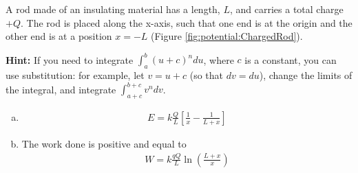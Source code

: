 \question \label{q:potential:E_field_from_rod} A rod made of an insulating material has a length, $L$, and carries a total charge $+Q$. The rod is placed along the x-axis, such that one end is at the origin and the other end is at a position $x=-L$ (Figure \ref{fig:potential:ChargedRod}).
\textbf{Hint:} If you need to integrate $\int_a^b (u+c)^n du$, where $c$ is a constant, you can use substitution: for example, let $v = u+c$ (so that $dv=du$), change the limits of the integral, and integrate $\int_{a+c}^{b+c}v^ndv$.
\begin{finalanswer}
\begin{enumerate}[(a)]
\item \begin{align*}
E=k\frac{Q}{L}\left[\frac{1}{x}-\frac{1}{L+x}\right]
\end{align*}
\item The work done is positive and equal to \begin{align*}
W=k\frac{qQ}{L}\ln\left( \frac{L+x}{x} \right)
\end{align*}
\end{enumerate}
\end{finalanswer}
